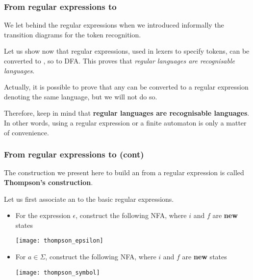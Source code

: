 
%
\begin{frame}
\frametitle{From regular expressions to }

We let behind the regular expressions when we introduced informally
the transition diagrams for the token recognition.

\bigskip

Let us show now that regular expressions, used in lexers to specify
tokens, can be converted to , so to DFA. This proves that
\emph{regular languages are recognisable languages}.

\bigskip

Actually, it is possible to prove that any \eNFA can be converted to a
regular expression denoting the same language, but we will not do so.

\bigskip

Therefore, keep in mind that \textbf{regular languages are
  recognisable languages}. In other words, using a regular expression
or a finite automaton is only a matter of convenience.

\end{frame}

%
\begin{frame}
\frametitle{From regular expressions to  (cont)}

The construction we present here to build an \eNFA from a regular
expression is called \textbf{Thompson's construction}.

\bigskip

Let us first associate an \eNFA to the basic regular expressions.
\begin{itemize}

  \item For the expression \(\epsilon\), construct the
   following NFA, where \(i\) and \(f\) are \textbf{new} states
  \begin{center}
    \texttt{[image: thompson\_epsilon]}
  \end{center}

  \item For \(a \in \Sigma\), construct the following NFA, where \(i\)
    and \(f\) are \textbf{new} states
  \begin{center}
    \texttt{[image: thompson\_symbol]}
  \end{center}

\end{itemize}

\end{frame}

